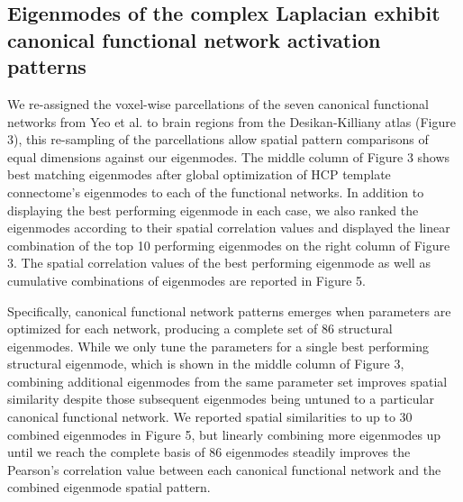 \documentclass{article}
\begin{document}
\subsection{Eigenmodes of the complex Laplacian exhibit canonical functional network activation patterns}
We re-assigned the voxel-wise parcellations of the seven canonical functional networks from Yeo et al. \cite{Yeo2011} to brain regions from the Desikan-Killiany atlas (Figure 3), this re-sampling of the parcellations allow spatial pattern comparisons of equal dimensions against our eigenmodes. The middle column of Figure 3 shows best matching eigenmodes after global optimization of HCP template connectome's eigenmodes to each of the functional networks. In addition to displaying the best performing eigenmode in each case, we also ranked the eigenmodes according to their spatial correlation values and displayed the linear combination of the top 10 performing eigenmodes on the right column of Figure 3. The spatial correlation values of the best performing eigenmode as well as cumulative combinations of eigenmodes are reported in Figure 5.

Specifically, canonical functional network patterns emerges when parameters are optimized for each network, producing a complete set of 86 structural eigenmodes. While we only tune the parameters for a single best performing structural eigenmode, which is shown in the middle column of Figure 3, combining additional eigenmodes from the same parameter set improves spatial similarity despite those subsequent eigenmodes being untuned to a particular canonical functional network. We reported spatial similarities to up to 30 combined eigenmodes in Figure 5, but linearly combining more eigenmodes up until we reach the complete basis of 86 eigenmodes steadily improves the Pearson's correlation value between each canonical functional network and the combined eigenmode spatial pattern.

\end{document}
